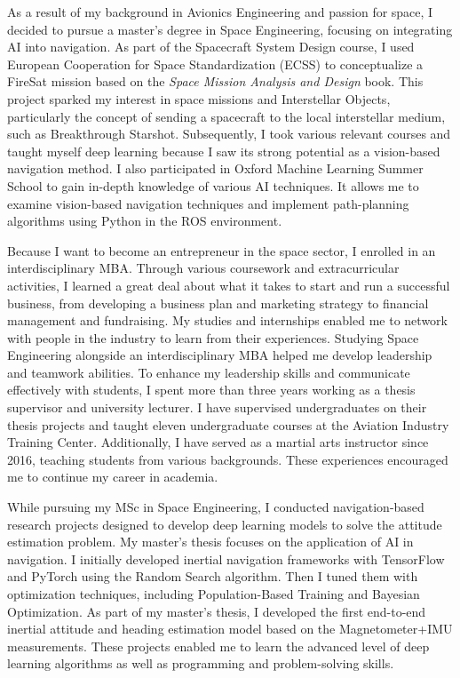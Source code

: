 \documentclass[a4,25pt]{article}
\begin{document}
\begin{large}
\vspace{-0.25cm}\quad As a result of my background in Avionics Engineering and passion for space, I decided to pursue a master's degree in Space Engineering, focusing on integrating AI into navigation. As part of the Spacecraft System Design course, I used European Cooperation for Space Standardization (ECSS) to conceptualize a FireSat mission based on the \textit{Space Mission Analysis and Design} book. This project sparked my interest in space missions and Interstellar Objects, particularly the concept of sending a spacecraft to the local interstellar medium, such as Breakthrough Starshot. Subsequently, I took various relevant courses and taught myself deep learning because I saw its strong potential as a vision-based navigation method. I also participated in Oxford Machine Learning Summer School to gain in-depth knowledge of various AI techniques. It allows me to examine vision-based navigation techniques and implement path-planning algorithms using Python in the ROS environment. \par
\vspace{-0.25cm}\quad Because I want to become an entrepreneur in the space sector, I enrolled in an interdisciplinary MBA. Through various coursework and extracurricular activities, I learned a great deal about what it takes to start and run a successful business, from developing a business plan and marketing strategy to financial management and fundraising. My studies and internships enabled me to network with people in the industry to learn from their experiences. Studying Space Engineering alongside an interdisciplinary MBA helped me develop leadership and teamwork abilities. To enhance my leadership skills and communicate effectively with students, I spent more than three years working as a thesis supervisor and university lecturer. I have supervised undergraduates on their thesis projects and taught eleven undergraduate courses at the Aviation Industry Training Center. Additionally, I have served as a martial arts instructor since 2016, teaching students from various backgrounds. These experiences encouraged me to continue my career in academia. \par
\vspace{-0.25cm}\quad 
While pursuing my MSc in Space Engineering, I conducted navigation-based research projects designed to develop deep learning models to solve the attitude estimation problem. My master's thesis focuses on the application of AI in navigation. I initially developed inertial navigation frameworks with TensorFlow and PyTorch using the Random Search algorithm. Then I tuned them with optimization techniques, including Population-Based Training and Bayesian Optimization. As part of my master's thesis, I developed the first end-to-end inertial attitude and heading estimation model based on the Magnetometer+IMU measurements. These projects enabled me to learn the advanced level of deep learning algorithms as well as programming and problem-solving skills.\par

\end{large}
\end{document}

